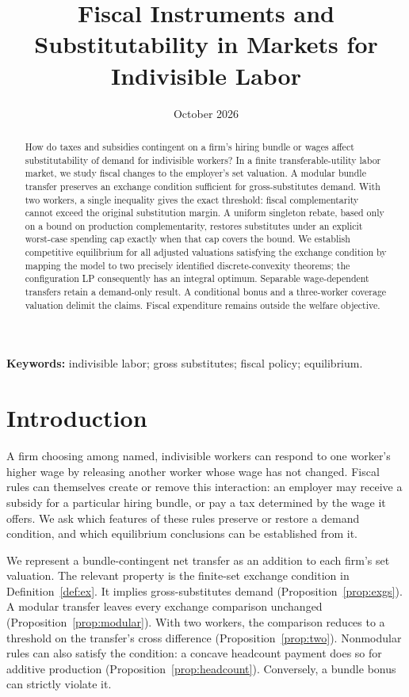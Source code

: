 \documentclass[11pt]{article}
\title{Fiscal Instruments and Substitutability in Markets for Indivisible Labor}
\author{}
\date{October 2026}
\theoremstyle{definition}
\theoremstyle{remark}
\numberwithin{equation}{section}
\begin{document}
\maketitle

\begin{abstract}
How do taxes and subsidies contingent on a firm's hiring bundle or wages affect substitutability of demand for indivisible workers? In a finite transferable-utility labor market, we study fiscal changes to the employer's set valuation. A modular bundle transfer preserves an exchange condition sufficient for gross-substitutes demand. With two workers, a single inequality gives the exact threshold: fiscal complementarity cannot exceed the original substitution margin. A uniform singleton rebate, based only on a bound on production complementarity, restores substitutes under an explicit worst-case spending cap exactly when that cap covers the bound. We establish competitive equilibrium for all adjusted valuations satisfying the exchange condition by mapping the model to two precisely identified discrete-convexity theorems; the configuration LP consequently has an integral optimum. Separable wage-dependent transfers retain a demand-only result. A conditional bonus and a three-worker coverage valuation delimit the claims. Fiscal expenditure remains outside the welfare objective.
\end{abstract}

\noindent\textbf{Keywords:} indivisible labor; gross substitutes; fiscal policy; equilibrium.

\section{Introduction}
A firm choosing among named, indivisible workers can respond to one worker's higher wage by releasing another worker whose wage has not changed. Fiscal rules can themselves create or remove this interaction: an employer may receive a subsidy for a particular hiring bundle, or pay a tax determined by the wage it offers. We ask which features of these rules preserve or restore a demand condition, and which equilibrium conclusions can be established from it.

We represent a bundle-contingent net transfer as an addition to each firm's set valuation. The relevant property is the finite-set exchange condition in Definition~\ref{def:ex}. It implies gross-substitutes demand (Proposition~\ref{prop:exgs}). A modular transfer leaves every exchange comparison unchanged (Proposition~\ref{prop:modular}). With two workers, the comparison reduces to a threshold on the transfer's cross difference (Proposition~\ref{prop:two}). Nonmodular rules can also satisfy the condition: a concave headcount payment does so for additive production (Proposition~\ref{prop:headcount}). Conversely, a bundle bonus can strictly violate it.
\end{document}
